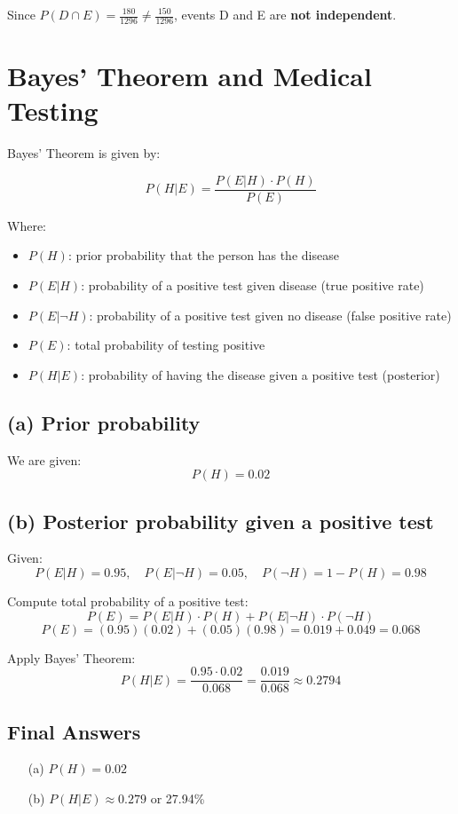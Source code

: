 \documentclass{article}
\begin{document}
Since \( P(D \cap E) = \frac{180}{1296} \ne \frac{150}{1296} \), events D and E are \textbf{not independent}.

\section*{Bayes' Theorem and Medical Testing}

Bayes' Theorem is given by:

\[
P(H|E) = \frac{P(E|H) \cdot P(H)}{P(E)}
\]

Where:
\begin{itemize}
    \item \( P(H) \): prior probability that the person has the disease
    \item \( P(E|H) \): probability of a positive test given disease (true positive rate)
    \item \( P(E|\neg H) \): probability of a positive test given no disease (false positive rate)
    \item \( P(E) \): total probability of testing positive
    \item \( P(H|E) \): probability of having the disease given a positive test (posterior)
\end{itemize}

\subsection*{(a) Prior probability}

We are given:
\[
P(H) = 0.02
\]

\subsection*{(b) Posterior probability given a positive test}

Given:
\[
P(E|H) = 0.95, \quad P(E|\neg H) = 0.05, \quad P(\neg H) = 1 - P(H) = 0.98
\]

Compute total probability of a positive test:
\[
P(E) = P(E|H) \cdot P(H) + P(E|\neg H) \cdot P(\neg H)
\]
\[
P(E) = (0.95)(0.02) + (0.05)(0.98) = 0.019 + 0.049 = 0.068
\]

Apply Bayes' Theorem:
\[
P(H|E) = \frac{0.95 \cdot 0.02}{0.068} = \frac{0.019}{0.068} \approx 0.2794
\]

\subsection*{Final Answers}
\begin{itemize}
    \item[(a)] \( P(H) = 0.02 \)
    \item[(b)] \( P(H|E) \approx 0.279 \) or 27.94\%
\end{itemize}
\end{document}
